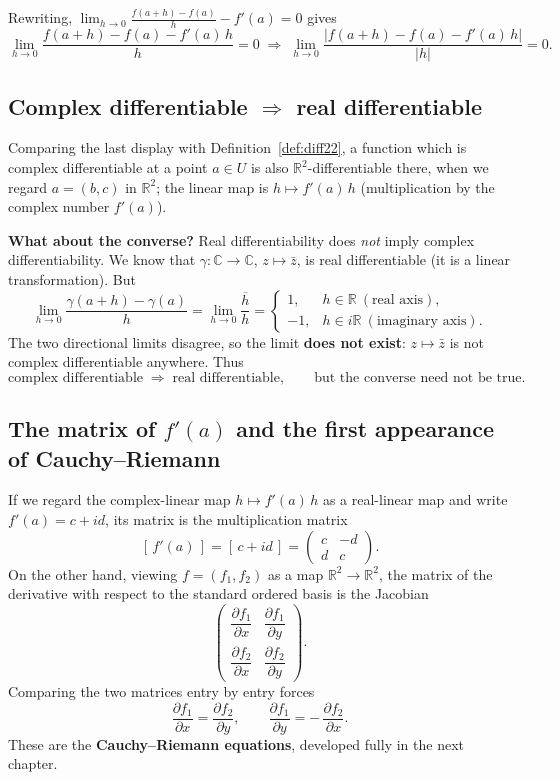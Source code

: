 \documentclass[11pt,openany]{report}
\newcommand{\C}{\mathbb{C}}
\newcommand{\R}{\mathbb{R}}
\newcommand{\abs}[1]{\left\lvert #1 \right\rvert}
\newcommand{\pd}[2]{\dfrac{\partial #1}{\partial #2}}
\begin{document}
Rewriting, $\displaystyle\lim_{h\to0}\frac{f(a+h)-f(a)}{h}-f'(a)=0$ gives
\[
  \lim_{h\to0} \frac{f(a+h)-f(a)-f'(a)\,h}{h} = 0
  \;\Longrightarrow\;
  \lim_{h\to0} \frac{\abs{ f(a+h)-f(a)-f'(a)\,h }}{\abs{h}} = 0.
\]

\subsection{Complex differentiable \texorpdfstring{$\Rightarrow$}{implies} real differentiable}

Comparing the last display with Definition~\ref{def:diff22}, a function which is complex
differentiable at a point $a\in U$ is also $\R^2$-differentiable there, when we regard
$a=(b,c)$ in $\R^2$; the linear map is $h\mapsto f'(a)\,h$ (multiplication by the complex
number $f'(a)$).

\begin{caution}
\textbf{What about the converse?} Real differentiability does \emph{not} imply complex
differentiability. We know that $\gamma:\C\to\C$, $z\mapsto\bar z$, is real differentiable
(it is a linear transformation). But
\[
  \lim_{h\to0}\frac{\gamma(a+h)-\gamma(a)}{h}
  = \lim_{h\to0}\frac{\overline{h}}{h}
  =
  \begin{cases}
    1, & h\in\R \ (\text{real axis}),\\[2pt]
    -1, & h\in i\R \ (\text{imaginary axis}).
  \end{cases}
\]
The two directional limits disagree, so the limit \textbf{does not exist}: $z\mapsto\bar z$
is not complex differentiable anywhere. Thus
\[
  \text{complex differentiable} \;\Longrightarrow\; \text{real differentiable},
  \qquad \text{but the converse need not be true.}
\]
\end{caution}

\subsection{The matrix of \texorpdfstring{$f'(a)$}{f'(a)} and the first appearance of Cauchy--Riemann}

If we regard the complex-linear map $h\mapsto f'(a)\,h$ as a real-linear map and write
$f'(a)=c+id$, its matrix is the multiplication matrix
\[
  [\,f'(a)\,] = [\,c+id\,] = \begin{pmatrix} c & -d \\ d & c \end{pmatrix}.
\]
On the other hand, viewing $f=(f_1,f_2)$ as a map $\R^2\to\R^2$, the matrix of the
derivative with respect to the standard ordered basis is the Jacobian
\[
  \begin{pmatrix}
    \pd{f_1}{x} & \pd{f_1}{y} \\[8pt]
    \pd{f_2}{x} & \pd{f_2}{y}
  \end{pmatrix}.
\]
Comparing the two matrices entry by entry forces
\[
  \boxed{\;\pd{f_1}{x} = \pd{f_2}{y}, \qquad \pd{f_1}{y} = -\,\pd{f_2}{x}.\;}
\]
These are the \textbf{Cauchy--Riemann equations}, developed fully in the next chapter.
\end{document}
